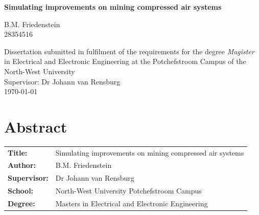 \documentclass[12pt, english, oneside, open=any]{report}
\begin{document}
\begin{titlepage}
	\BgThispage	
		\vspace{0cm}
		\begin{center}
			\textbf{\singlespacing\huge{Simulating improvements on mining compressed air systems}\\
			}\par
			\vspace{3cm}
			\LARGE{B.M. Friedenstein \\28354516}\\
		\end{center}
	
	\vspace{2cm}
	
\begin{flushleft}
	{\singlespacing\centering \large Dissertation submitted in fulfilment of the requirements for the degree {\color{blue} \textit{Magister}} in {\color{blue}Electrical and Electronic Engineering} at the Potchefstroom Campus of the North-West University\\
	}
	\vspace{2cm}
	{\large \setlength{\parindent}{0.5cm} Supervisor: Dr Johann van Rensburg \\
	\vspace{1cm}
	\large{\monthyeardate\today}\\		
	}
\end{flushleft}
\end{titlepage}
\clearpage

{\tiny }\section*{Abstract}
	\thispagestyle{plain}
	\vspace{0.2cm}
	\begin{tabular}{p{2.35cm}p{13cm}}
		\textbf{Title:} & Simulating improvements on mining compressed air systems  \\
		\textbf{Author:} & B.M. Friedenstein \\
		\textbf{Supervisor:} & Dr Johann van Rensburg \\
		\textbf{School:} & North-West University Potchefstroom Campus\\
		\textbf{Degree:} & Masters in Electrical and Electronic Engineering \\
	\end{tabular}
	\vspace{1cm}
\end{document}
